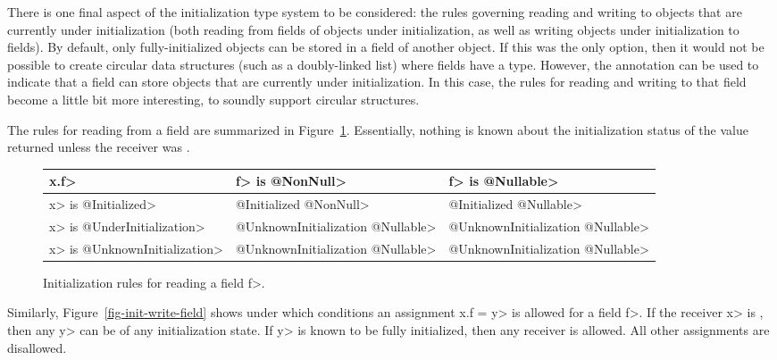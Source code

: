There is one final aspect of the initialization type system to be
considered:  the rules governing reading and writing to objects that are
currently under initialization (both reading from fields of objects under
initialization, as well as writing objects under initialization to fields).
By default, only fully-initialized objects can be stored in a field of
another object.  If this was the only option, then it would not be possible
to create circular data structures (such as a doubly-linked list) where
fields have a  type.  However,
the annotation
 can be used to
indicate that a field can store objects that are currently under initialization.
In this case, the rules for reading and writing to that field become a little
bit more interesting, to soundly support circular structures.

The rules for reading from a
 field
are summarized in Figure~\ref{fig-init-read-field}.  Essentially, nothing is
known about the initialization status of the value returned unless the receiver
was .

\begin{figure}
\centering
\begin{tabular}{l|l|l}
  \<x.f>&\<f> is \<@NonNull>& \<f> is \<@Nullable>\\ \hline
  \<x> is \<@Initialized> & \<@Initialized @NonNull> & \<@Initialized @Nullable> \\
  \<x> is \<@UnderInitialization> & \<@UnknownInitialization @Nullable> & \<@UnknownInitialization @Nullable> \\
  \<x> is \<@UnknownInitialization> & \<@UnknownInitialization @Nullable> & \<@UnknownInitialization @Nullable> \\
\end{tabular}
\caption{Initialization rules for reading a  field \<f>.}
\label{fig-init-read-field}
\end{figure}

Similarly, Figure~\ref{fig-init-write-field} shows under which conditions
an assignment \<x.f = y> is allowed for a
 field \<f>.
If the receiver \<x> is
, then any
\<y> can be of any initialization state.  If \<y> is known to be
fully initialized, then any receiver is allowed.  All other assignments
are disallowed.

